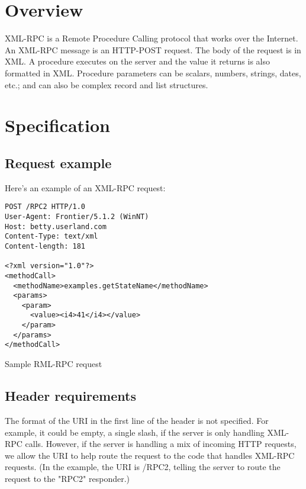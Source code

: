%
%


\label{chap:xml-rpc}


%
%

\section{Overview}

XML-RPC is a Remote Procedure Calling protocol that works over the Internet.
An XML-RPC message is an HTTP-POST request. The body of the request is in XML. A procedure executes on the server and the value it returns is also formatted in XML.
Procedure parameters can be scalars, numbers, strings, dates, etc.; and can also be complex record and list structures.


%
%

\section{Specification}

\subsection{Request example}

Here's an example of an XML-RPC request:
\begin{code}
\begin{verbatim}
POST /RPC2 HTTP/1.0
User-Agent: Frontier/5.1.2 (WinNT)
Host: betty.userland.com
Content-Type: text/xml
Content-length: 181

<?xml version="1.0"?>
<methodCall>
  <methodName>examples.getStateName</methodName>
  <params>
    <param>
      <value><i4>41</i4></value>
    </param>
  </params>
</methodCall>
\end{verbatim}
\caption{Sample RML-RPC request}
\end{code}

\subsection{Header requirements}

The format of the URI in the first line of the header is not specified. For example, it could be empty, a single slash, if the server is only handling XML-RPC calls. However, if the server is handling a mix of incoming HTTP requests, we allow the URI to help route the request to the code that handles XML-RPC requests. (In the example, the URI is /RPC2, telling the server to route the request to the "RPC2" responder.)

